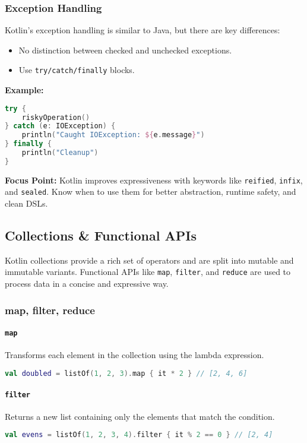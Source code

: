 \documentclass[a4paper,12pt]{article}
\begin{document}
\subsubsection{Exception Handling}

Kotlin's exception handling is similar to Java, but there are key differences:

\begin{itemize}
  \item No distinction between checked and unchecked exceptions.
  \item Use \texttt{try/catch/finally} blocks.
\end{itemize}

\textbf{Example:}
\begin{lstlisting}[language=Kotlin]
try {
    riskyOperation()
} catch (e: IOException) {
    println("Caught IOException: ${e.message}")
} finally {
    println("Cleanup")
}
\end{lstlisting}

\textbf{Focus Point:} Kotlin improves expressiveness with keywords like \texttt{reified}, \texttt{infix}, and \texttt{sealed}. Know when to use them for better abstraction, runtime safety, and clean DSLs.


\subsection{Collections \& Functional APIs}

Kotlin collections provide a rich set of operators and are split into mutable and immutable variants. Functional APIs like \texttt{map}, \texttt{filter}, and \texttt{reduce} are used to process data in a concise and expressive way.

\subsubsection{map, filter, reduce}

\paragraph{\texttt{map}}  
Transforms each element in the collection using the lambda expression.
\begin{lstlisting}[language=Kotlin]
val doubled = listOf(1, 2, 3).map { it * 2 } // [2, 4, 6]
\end{lstlisting}

\paragraph{\texttt{filter}}  
Returns a new list containing only the elements that match the condition.
\begin{lstlisting}[language=Kotlin]
val evens = listOf(1, 2, 3, 4).filter { it % 2 == 0 } // [2, 4]
\end{lstlisting}
\end{document}
